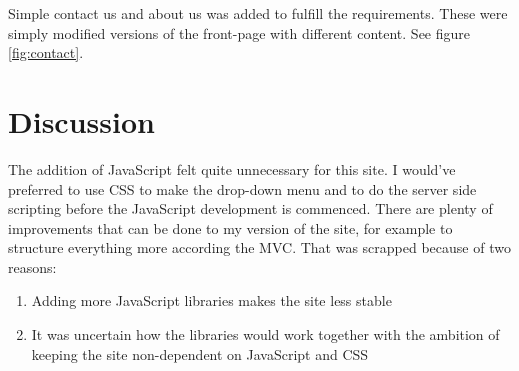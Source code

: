 \documentclass[a4paper]{scrartcl}
\begin{document}
Simple contact us and about us was added to fulfill the requirements. These were simply modified versions of the front-page with different content. See figure \ref{fig:contact}.

\section{Discussion}

The addition of JavaScript felt quite unnecessary for this site. I would've preferred to use CSS to make the drop-down menu and to do the server side scripting before the JavaScript development is commenced. There are plenty of improvements that can be done to my version of the site, for example to structure everything more according the MVC. That was scrapped because of two reasons:

\begin{enumerate}
\item Adding more JavaScript libraries makes the site less stable
\item It was uncertain how the libraries would work together with the ambition of keeping the site non-dependent on JavaScript and CSS
\end{enumerate}
\end{document}
